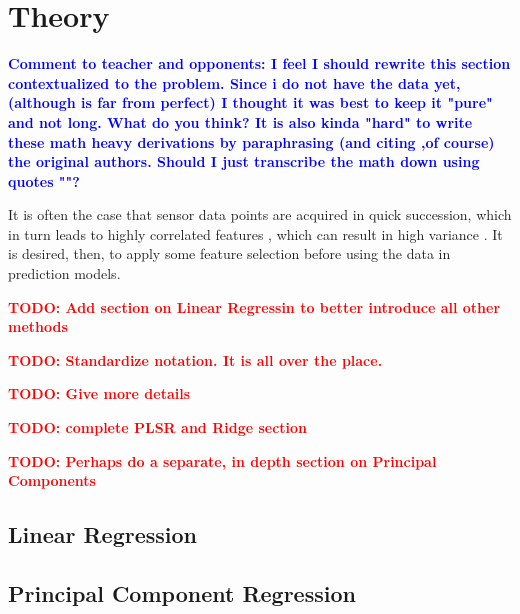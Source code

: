 
\chapter{Theory}
\label{cha:theory}

\textbf{\textcolor{blue}{Comment to teacher and opponents: I feel I should rewrite this section contextualized to the problem. Since i do not have the data yet,  (although is far from perfect) I thought it was best to keep it "pure" and not long. What do you think? It is also kinda "hard" to write these math heavy derivations by paraphrasing (and citing ,of course) the original authors. Should I just transcribe the math down using quotes ""?}}

It is often the case that sensor data points are acquired in quick succession, which in turn leads to highly correlated features \cite{Bastuck_2019}, which can result in high variance \cite{friedman2001}. It is desired, then, to apply some feature selection before using the data in prediction models.

\textbf{\textcolor{red}{TODO: Add section on Linear Regressin to better introduce all other methods}}

\textbf{\textcolor{red}{TODO: Standardize notation.  It is all over the place.}}

\textbf{\textcolor{red}{TODO: Give more details}}

\textbf{\textcolor{red}{TODO: complete PLSR and Ridge section}}

\textbf{\textcolor{red}{TODO: Perhaps do a separate, in depth section on Principal Components}}

\section{Linear Regression}
\label{sec:linreg}

\section{Principal Component Regression}
\label{sec:pcr}

